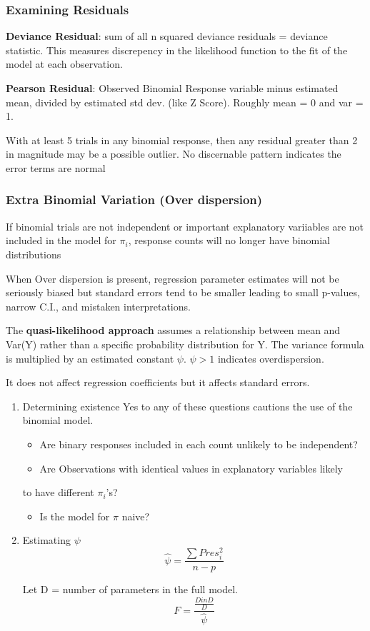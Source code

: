 \documentclass[11pt]{article}
\begin{document}
\subsubsection{Examining Residuals}
\label{sec:org9778c00}
\textbf{Deviance Residual}: sum of all n squared deviance residuals = deviance
statistic. This measures discrepency in the likelihood function to the
fit of the model at each observation.

\textbf{Pearson Residual}: Observed Binomial Response variable minus estimated
mean, divided by estimated std dev. (like Z Score). Roughly mean = 0 and
var = 1.

With at least 5 trials in any binomial response, then any residual
greater than 2 in magnitude may be a possible outlier. No discernable
pattern indicates the error terms are normal

\subsubsection{Extra Binomial Variation (Over dispersion)}
\label{sec:orgc51c1ed}
If binomial trials are not independent or important explanatory
variiables are not included in the model for \(\pi_i\), response counts
will no longer have binomial distributions

When Over dispersion is present, regression parameter estimates will not
be seriously biased but standard errors tend to be smaller leading to
small p-values, narrow C.I., and mistaken interpretations.

The \textbf{quasi-likelihood approach} assumes a relationship between mean and
Var(Y) rather than a specific probability distribution for Y. The
variance formula is multiplied by an estimated constant \(\psi\).
\(\psi \gt 1\) indicates overdispersion.

It does not affect regression coefficients but it affects standard
errors.

\begin{enumerate}
\item Determining existence
\label{sec:org07ba2c9}
Yes to any of these questions cautions the use of the binomial model.
\begin{itemize}
\item Are binary responses included in each count unlikely to be independent?
\item Are Observations with identical values in explanatory variables likely
\end{itemize}
to have different \(\pi_i\)'s?
\begin{itemize}
\item Is the model for \(\pi\) naive?
\end{itemize}

\item Estimating \(\psi\)
\label{sec:orgceef634}
$$
    \hat{\psi} = \frac{\sum Pres_i^2}{n - p}
$$

Let D = number of parameters in the full model. $$
    F = \frac{\frac{DinD}{D}}{\hat{\psi}}
$$
\end{enumerate}
\end{document}
